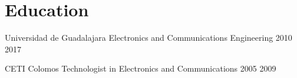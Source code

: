 
\section{Education}

\eduitem
    {Universidad de Guadalajara}
    {Electronics and Communications Engineering}
    {2010}
    {2017}


\eduitem
    {CETI Colomos}
    {Technologist in Electronics and Communications}
    {2005}
    {2009}